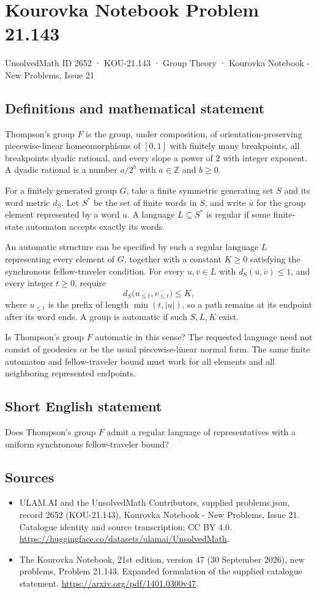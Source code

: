 \documentclass[11pt,a4paper]{article}
\begin{document}
\section*{Kourovka Notebook Problem 21.143}\label{2652}
{\small UnsolvedMath ID 2652 · KOU-21.143 · Group Theory · Kourovka Notebook - New Problems, Issue 21}
\subsection{Definitions and mathematical statement}
Thompson's group $F$ is the group, under composition, of orientation-preserving piecewise-linear homeomorphisms of $[0,1]$ with finitely many breakpoints, all breakpoints dyadic rational, and every slope a power of $2$ with integer exponent. A dyadic rational is a number $a/2^b$ with $a\in\mathbb Z$ and $b\ge0$.

For a finitely generated group $G$, take a finite symmetric generating set $S$ and its word metric $d_S$. Let $S^*$ be the set of finite words in $S$, and write $\overline u$ for the group element represented by a word $u$. A language $L\subseteq S^*$ is regular if some finite-state automaton accepts exactly its words.

An automatic structure can be specified by such a regular language $L$ representing every element of $G$, together with a constant $K\ge0$ satisfying the synchronous fellow-traveler condition. For every $u,v\in L$ with $d_S(\overline u,\overline v)\le1$, and every integer $t\ge0$, require
\[
 d_S\bigl(\overline{u_{\le t}},\overline{v_{\le t}}\bigr)\le K,
\]
where $u_{\le t}$ is the prefix of length $\min(t,|u|)$, so a path remains at its endpoint after its word ends. A group is automatic if such $S,L,K$ exist.

Is Thompson's group $F$ automatic in this sense? The requested language need not consist of geodesics or be the usual piecewise-linear normal form. The same finite automaton and fellow-traveler bound must work for all elements and all neighboring represented endpoints.
\subsection{Short English statement}
Does Thompson’s group $F$ admit a regular language of representatives with a uniform synchronous fellow-traveler bound?
\subsection{Sources}
\begin{itemize}
\item[S1] ULAM.AI and the UnsolvedMath Contributors, supplied problems.json, record 2652 (KOU-21.143), Kourovka Notebook - New Problems, Issue 21. Catalogue identity and source transcription; CC BY 4.0.
\url{https://huggingface.co/datasets/ulamai/UnsolvedMath}.
\item[S2] The Kourovka Notebook, 21st edition, version 47 (30 September 2026), new problems, Problem 21.143. Expanded formulation of the supplied catalogue statement.
\url{https://arxiv.org/pdf/1401.0300v47}.
\end{itemize}
\end{document}
